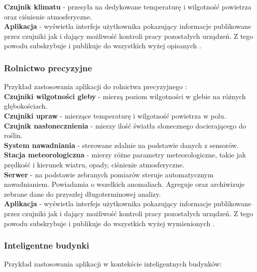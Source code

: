 \textbf{Czujnik klimatu} - przesyła na dedykowane  temperaturę i wilgotność powietrza oraz ciśnienie atmosferyczne.\\

\textbf{Aplikacja} - wyświetla interfejs użytkownika pokazujący informacje publikowane przez czujniki jak i dający możliwość kontroli pracy pozostałych urządzeń. Z tego powodu subskrybuje i publikuje do wszystkich wyżej opisanych .\\

\newpage

\subsubsection{Rolnictwo precyzyjne}
Przykład zastosowania aplikacji do rolnictwa precyzyjnego \cite{rolnictwoprecyzyjne}:\\

\textbf{Czujniki wilgotności gleby} - mierzą poziom wilgotności w glebie na różnych głębokościach.\\

\textbf{Czujniki upraw} - mierzące temperaturę i wilgotność powietrza w polu.\\

\textbf{Czujnik nasłonecznienia} - mierzy ilość światła słonecznego docierającego do roślin.\\

\textbf{System nawadniania} - sterowane zdalnie na podstawie danych z sensorów.\\

\textbf{Stacja meteorologiczna} - mierzy różne parametry meteorologiczne, takie jak prędkość i kierunek wiatru, opady, ciśnienie atmosferyczne.\\

\textbf{Serwer} - na podstawie zebranych pomiarów steruje automatycznym nawadnianiem. Powiadamia o wszelkich anomaliach. Agreguje oraz archiwizuje zebrane dane do przyszłej długoterminowej analizy.\\

\textbf{Aplikacja} - wyświetla interfejs użytkownika pokazujący informacje publikowane przez czujniki jak i dający możliwość kontroli pracy pozostałych urządzeń. Z tego powodu subskrybuje i publikuje do wszystkich wyżej wymienionych .\\

\newpage

\subsubsection{Inteligentne budynki}
Przykład zastosowania aplikacji w kontekście inteligentnych budynków:\\

